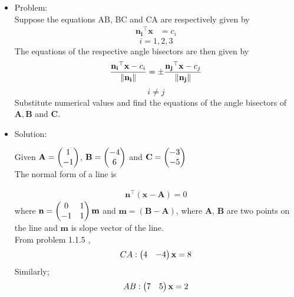 \documentclass{article}
\begin{document}
\let\vec\mathbf
\begin{itemize}

\item Problem:
   \\ Suppose the equations AB, BC and CA are respectively given by 
                 \begin{align}
                 \label{eq:a}
                 \vec{n_i}^{\top}\vec{x} &= c_i
                 \end{align}      
                \[i=1,2,3\]
The equations of the respective angle bisectors are then given by
\begin{align}
\label{eq:b}
\frac{\vec{n_i}^{\top}\vec{x}-c_i}{\norm{\vec{n_i}}} = \pm\frac{\vec{n_j}^{\top}\vec{x}-c_j}{\norm{{\vec{n_j}}}}
\end{align}
\[i \neq j\]
Substitute numerical values and find the equations of the angle bisectors of $\vec{A},\vec{B}$ and $\vec{C}$.



\item Solution:
    
Given $\vec{A} = \myvec{1\\-1}$, $\vec{B} = \myvec{-4\\6}$ and $\vec{C} = \myvec{-3\\-5}$
 \\The normal form of a line is 
                                    
           \begin{align}
           \label{eq:c}
           \vec{n}^{\top}(\vec{x}-\vec{A}) = 0   
           \end{align}
           where $\vec{n} = \myvec{0&1\\-1&1}\vec{m}$ and $\vec{m} = (\vec{B} - \vec{A})$, where $\vec{A}$, $\vec{B}$ are two points on the line and $\vec{m}$ is slope vector of the line.\\
 From problem 1.1.5 ,
  \begin{align}
  \label{eq:d}
        CA : \myvec{4&-4}\vec{x} = 8
        \end{align}
  Similarly;
        \begin{align}
         \label{eq:e}
        AB : \myvec{7&5}\vec{x} = 2
        \end{align}
        

\end{itemize}
\end{document}
